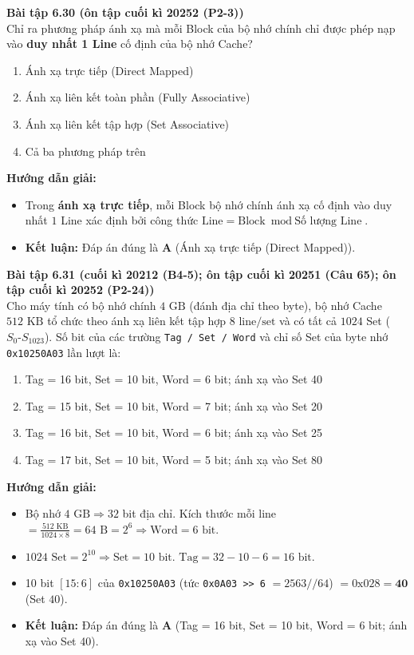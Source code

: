 \textbf{Bài tập 6.30 (ôn tập cuối kì 20252 (P2-3))}\\
Chỉ ra phương pháp ánh xạ mà mỗi Block của bộ nhớ chính chỉ được phép nạp vào \textbf{duy nhất 1 Line} cố định của bộ nhớ Cache?
\begin{enumerate}[label=\Alph*.]
    \item Ánh xạ trực tiếp (Direct Mapped)
    \item Ánh xạ liên kết toàn phần (Fully Associative)
    \item Ánh xạ liên kết tập hợp (Set Associative)
    \item Cả ba phương pháp trên
\end{enumerate}
\textbf{Hướng dẫn giải:}
\begin{itemize}
    \item Trong \textbf{ánh xạ trực tiếp}, mỗi Block bộ nhớ chính ánh xạ cố định vào duy nhất $1$ Line xác định bởi công thức $\text{Line} = \text{Block} \bmod \text{Số lượng Line}$.
    \item \textbf{Kết luận:} Đáp án đúng là \textbf{A} (Ánh xạ trực tiếp (Direct Mapped)).
\end{itemize}

\textbf{Bài tập 6.31 (cuối kì 20212 (B4-5); ôn tập cuối kì 20251 (Câu 65); ôn tập cuối kì 20252 (P2-24))}\\
Cho máy tính có bộ nhớ chính $4\text{ GB}$ (đánh địa chỉ theo byte), bộ nhớ Cache $512\text{ KB}$ tổ chức theo ánh xạ liên kết tập hợp $8\text{ line/set}$ và có tất cả $1024$ Set ($S_0\text{-}S_{1023}$). Số bit của các trường \texttt{Tag / Set / Word} và chỉ số Set của byte nhớ \texttt{0x10250A03} lần lượt là:
\begin{enumerate}[label=\Alph*.]
    \item Tag = 16 bit, Set = 10 bit, Word = 6 bit; ánh xạ vào Set 40
    \item Tag = 15 bit, Set = 10 bit, Word = 7 bit; ánh xạ vào Set 20
    \item Tag = 16 bit, Set = 10 bit, Word = 6 bit; ánh xạ vào Set 25
    \item Tag = 17 bit, Set = 10 bit, Word = 5 bit; ánh xạ vào Set 80
\end{enumerate}
\textbf{Hướng dẫn giải:}
\begin{itemize}
    \item Bộ nhớ $4\text{ GB} \Rightarrow 32$ bit địa chỉ. Kích thước mỗi line $= \frac{512\text{ KB}}{1024 \times 8} = 64\text{ B} = 2^6 \Rightarrow \text{Word} = 6\text{ bit}$.
    \item $1024\text{ Set} = 2^{10} \Rightarrow \text{Set} = 10\text{ bit}$. $\text{Tag} = 32 - 10 - 6 = 16\text{ bit}$.
    \item 10 bit $[15:6]$ của \texttt{0x10250A03} (tức \texttt{0x0A03 >> 6} $= 2563 // 64$) $= \text{0x028} = \mathbf{40}$ (Set $40$).
    \item \textbf{Kết luận:} Đáp án đúng là \textbf{A} (Tag = 16 bit, Set = 10 bit, Word = 6 bit; ánh xạ vào Set 40).
\end{itemize}

